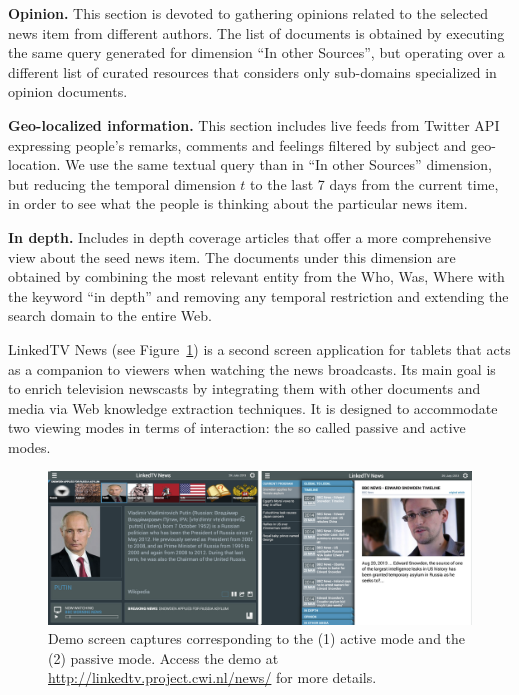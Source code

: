 \documentclass[a4paper,11pt]{report}
\begin{document}
\textbf{Opinion.} This section is devoted to gathering opinions related to the selected news item from different authors. The list of documents is obtained by executing the same query generated for dimension ``In other Sources'', but operating over a different list of curated resources that considers only sub-domains specialized in opinion documents.

\textbf{Geo-localized information.} This section includes live feeds from Twitter API expressing people's remarks, comments and feelings filtered by subject and geo-location. We use the same textual query than in ``In other Sources'' dimension, but reducing the temporal dimension $t$ to the last 7 days from the current time, in order to see what the people is thinking about the particular news item.

\textbf{In depth.} Includes in depth coverage articles that offer a more comprehensive view about the seed news item. The documents under this dimension are obtained by combining the most relevant entity from the Who, Was, Where with the keyword ``in depth'' and removing any temporal restriction and extending the search domain to the entire Web.

LinkedTV News (see Figure~\ref{fig:DemoScreen}) is a second screen application for tablets that acts as a companion to viewers when watching the news broadcasts. Its main goal is to enrich television newscasts by integrating them with other documents and media via Web knowledge extraction techniques. It is designed to accommodate two viewing modes in terms of interaction: the so called passive and active modes.

\begin{figure}[htbp!]
\centering
\includegraphics[width=1\textwidth]{figure/DemoScreen}
\caption{Demo screen captures corresponding to the (1) active mode and the (2) passive mode. Access the demo at \protect\url{http://linkedtv.project.cwi.nl/news/} for more details.}
\label{fig:DemoScreen}%
\end{figure}
\end{document}
